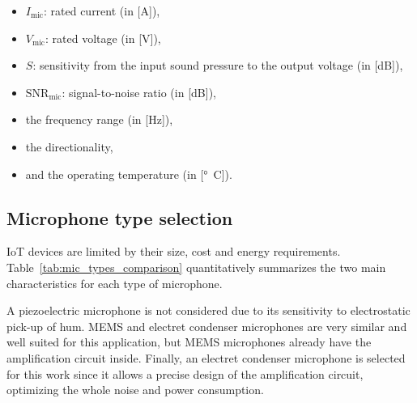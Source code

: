 \documentclass{EPL-master-thesis-covers-EN}
\newcommand{\te}[1]{\textrm{#1}}
\begin{document}
\begin{itemize}
 \item $I_{\te{mic}}$: rated current (in [A]),
 \item $V_{\te{mic}}$: rated voltage (in [V]),
 \item $S$: sensitivity from the input sound pressure to the output voltage (in [dB]),
 \item $\te{SNR}_{\te{mic}}$: signal-to-noise ratio (in [dB]),
 \item the frequency range (in [Hz]),
 \item the directionality,
 \item and the operating temperature (in [\si{\degree C}]).
\end{itemize}


\subsection*{Microphone type selection}

IoT devices are limited by their size, cost and energy requirements. Table~\ref{tab:mic_types_comparison} quantitatively summarizes the two main characteristics for each type of microphone.

\begin{table}[H]
\centering
{}
\caption{Comparison of several types of microphone}
\label{tab:mic_types_comparison}
\end{table}

A piezoelectric microphone is not considered due to its sensitivity to electrostatic pick-up of hum. MEMS and electret condenser microphones are very similar and well suited for this application, but MEMS microphones already have the amplification circuit inside.
Finally, an electret condenser microphone is selected for this work since it allows a precise design of the amplification circuit, optimizing the whole noise and power consumption.
\end{document}
